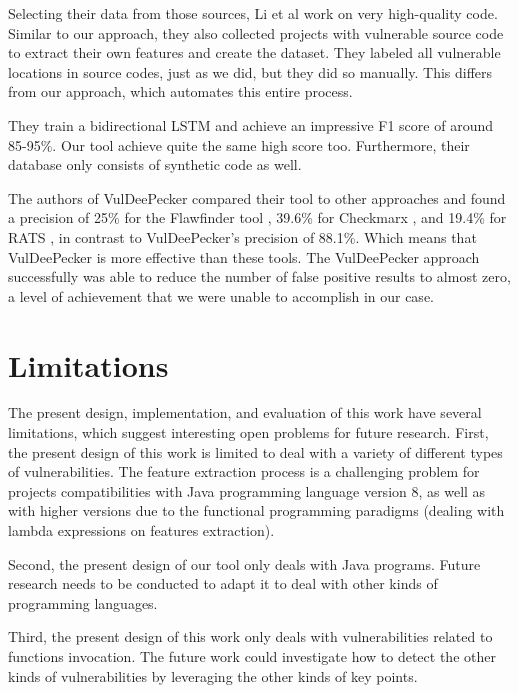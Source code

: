 Selecting their data from those sources, Li et al work on very high-quality code. Similar to our approach, they also collected projects with vulnerable source code to extract their own features and create the dataset. They labeled all vulnerable locations in source codes, just as we did, but they did so manually. This differs from our approach, which automates this entire process.

They train a bidirectional LSTM and achieve an impressive F1 score of around 85-95\%. Our tool achieve quite the same high score too. Furthermore, their database only consists of synthetic code as well.

The authors of VulDeePecker compared their tool to other approaches and found a precision of 25\% for the Flawfinder  tool \cite{Flawfinder_}, 39.6\% for Checkmarx \cite{Checkmarx_}, and 19.4\% for RATS \cite{RATS_}, in contrast to VulDeePecker's precision of 88.1\%. Which means that VulDeePecker is more effective than these tools. The VulDeePecker approach successfully was able to reduce the number of false positive results to almost zero, a level of achievement that we were unable to accomplish in our case.



\section{Limitations} %
\label{sec:LIMITATIONS_SEC}

The present design, implementation, and evaluation of this work have several limitations, which suggest interesting open problems for future research. First, the present design of this work is limited to deal with a variety of different types of vulnerabilities. The feature extraction process is a challenging problem for projects compatibilities with Java programming language version 8, as well as with higher versions due to the functional programming paradigms (dealing with lambda expressions on features extraction).

Second, the present design of our tool only deals with Java programs. Future research needs to be conducted to adapt it to deal with other kinds of programming languages.

Third, the present design of this work only deals with vulnerabilities related to functions invocation. The future work could investigate how to detect the other kinds of vulnerabilities by leveraging the other kinds of key points.

